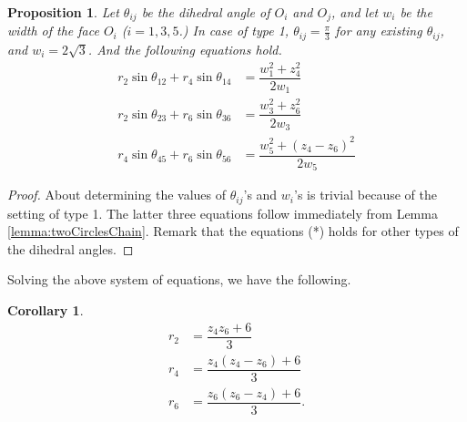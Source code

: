 \documentclass[suppldata, dvipdfmx]{interact}
\theoremstyle{plain}%
\newtheorem{corollary}[theorem]{Corollary}
\newtheorem{proposition}[theorem]{Proposition}
\theoremstyle{definition}
\theoremstyle{remark}
\theoremstyle{problemstyle}
\begin{document}


\begin{proposition}\label{angles}
Let $\theta_{ij}$ be the dihedral angle of $O_i$ and $O_j$, and let $w_i$ be the width of the face $O_i$ ($i=1,3,5$.)  In case of type 1, $\theta_{ij}=\frac{\pi}{3}$ for any existing $\theta_{ij}$, and $w_i=2\sqrt{3}$.  And the following equations hold. 
 \begin{align*}
 r_2\sin\theta_{12} + r_4\sin\theta_{14} &= \dfrac{w_1^2+z_4^2}{2w_1}\\
 r_2\sin\theta_{23} + r_6\sin\theta_{36} &= \dfrac{w_3^2+z_6^2}{2w_3}\tag{*}\\
 r_4\sin\theta_{45} + r_6\sin\theta_{56} &= \dfrac{w_5^2+(z_4 - z_6)^2}{2w_5}
 \end{align*}
\end{proposition}

\begin{proof}
About determining the values of $\theta_{ij}$'s and $w_i$'s is trivial because of the setting of type 1.  The latter three equations follow immediately from Lemma \ref{lemma:twoCirclesChain}.  Remark that the equations (*) holds for other types of the dihedral angles. 
\end{proof}

Solving the above system of equations, we have the following.

\begin{corollary}
\begin{align*}
 r_2 &= \dfrac{z_4z_6 + 6}{3} \\
 r_4 &= \dfrac{z_4(z_4-z_6) + 6}{3} \tag{**}\\
 r_6 &= \dfrac{z_6(z_6-z_4) + 6}{3}.
\end{align*}
\end{corollary}
\end{document}
